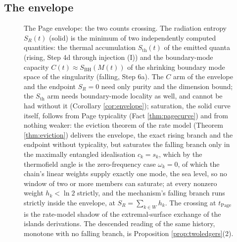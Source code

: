 \documentclass[11pt]{article}
\theoremstyle{definition}
\newcommand{\Sth}{S_{\mathrm{th}}}
\begin{document}
\subsection{The envelope}\label{subsec:envelope}

\begin{figure}[t]
\centering
{}
\caption{The Page envelope: the two counts crossing. The radiation entropy $S_R(t)$ (solid) is the minimum of two independently computed quantities: the thermal accumulation $\Sth(t)$ of the emitted quanta (rising, Step 4d through injection (I)) and the boundary-mode capacity $C(t) \approx S_{\mathrm{BH}}(M(t))$ of the shrinking boundary mode space of the singularity (falling, Step 6a). The $C$ arm of the envelope and the endpoint $S_R = 0$ need only purity and the dimension bound; the $\Sth$ arm needs boundary-mode locality as well, and cannot be had without it (Corollary \ref{cor:envelope}); saturation, the solid curve itself, follows from Page typicality (Fact \ref{thm:pagecurve}) and from nothing weaker: the eviction theorem of the rate model (Theorem \ref{thm:eviction}) delivers the envelope, the exact rising branch and the endpoint without typicality, but saturates the falling branch only in the maximally entangled idealisation $c_k = s_k$, which by the thermofield angle is the zero-frequency case $\omega_k = 0$, of which the chain's linear weights supply exactly one mode, the sea level, so no window of two or more members can saturate; at every nonzero weight $h_k < \ln 2$ strictly, and the mechanism's falling branch runs strictly inside the envelope, at $S_R = \sum_{k \in W} h_k$. The crossing at $t_{\mathrm{Page}}$ is the rate-model shadow of the extremal-surface exchange of the islands derivations. The descended reading of the same history, monotone with no falling branch, is Proposition \ref{prop:twoledgers}(2).}
\label{fig:page}
\end{figure}
\end{document}
